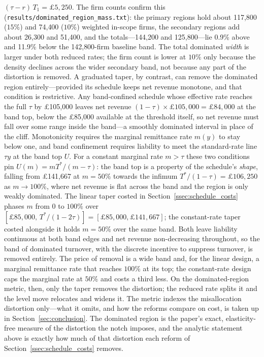 $(\tau-r)\,T_{1}=\pounds5{,}250$. The firm counts confirm this
(\texttt{results/dominated\_region\_mass.txt}): the primary regions hold about
117{,}800 ($15\%$) and 74{,}400 ($10\%$) weighted in-scope firms, the
secondary regions add about 26{,}300 and 51{,}400, and the
totals---144{,}200 and 125{,}800---lie 0.9\% above and 11.9\%
below the 142{,}800-firm baseline band. The total dominated \emph{width} is
larger under both reduced rates; the firm count is lower at $10\%$ only because
the density declines across the wider secondary band, not because any part of
the distortion is removed. A graduated taper, by contrast, can remove the
dominated region entirely---provided its schedule keeps net revenue monotone,
and that condition is restrictive. Any band-confined schedule whose effective
rate reaches the full $\tau$ by \pounds105{,}000 leaves net revenue
$(1-\tau)\times\pounds105{,}000=\pounds84{,}000$ at the band top, below the
\pounds85{,}000 available at the threshold itself, so net revenue must fall over
some range inside the band---a smoothly dominated interval in place of the
cliff. Monotonicity requires the marginal remittance rate $m(y)$ to stay below
one, and band confinement requires liability to meet the standard-rate line
$\tau y$ at the band top $U$. For a constant marginal rate $m>\tau$ these two
conditions pin $U(m)=mT^{*}/(m-\tau)$: the band top is a property of the
schedule's \emph{shape}, falling from \pounds141{,}667 at $m=50\%$ towards
the infimum $T^{*}/(1-\tau)=\pounds106{,}250$ as $m\to100\%$, where net
revenue is flat across the band and the region is only weakly dominated. The
linear taper costed in Section~\ref{ssec:schedule_costs} phases $m$ from $0$ to
$100\%$ over $[\pounds85{,}000,\,T^{*}/(1-2\tau)]=[\pounds85{,}000,\pounds141{,}667]$;
the constant-rate taper costed alongside it holds $m=50\%$ over the same band.
Both leave liability continuous at both band edges and net revenue
non-decreasing throughout, so the band of dominated turnover, with the discrete
incentive to suppress turnover, is removed entirely. The price of removal is a
wide band and, for the linear design, a marginal remittance rate that reaches
$100\%$ at its top; the constant-rate design caps the marginal rate at $50\%$
and costs a third less. On the dominated-region metric,
then, only the taper removes the distortion; the reduced rate splits it and the
level move relocates and widens it. The metric indexes the misallocation distortion
only---what it omits, and how the reforms compare on cost, is taken up in
Section~\ref{sec:conclusion}. The dominated region is the paper's exact,
elasticity-free measure of the distortion the notch imposes, and the analytic
statement above is exactly how much of that distortion each reform of
Section~\ref{ssec:schedule_costs} removes.
